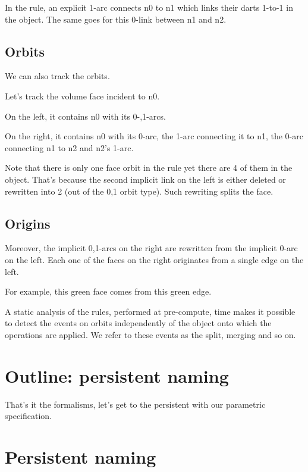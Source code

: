 \documentclass[11pt]{article}
\begin{document}
In the rule, an explicit 1-arc connects n0 to n1 which links their darts 1-to-1 in the object. %
The same goes for this 0-link between n1 and n2. %

\subsection{Orbits}
\label{sec:orgcf72bd7}

We can also track the orbits.

Let's track the volume face incident to n0.

On the left, it contains n0 with its 0-,1-arcs.

On the right, it contains n0 with its 0-arc, the 1-arc connecting it to n1, the
0-arc connecting n1 to n2 and n2's 1-arc.

Note that there is only one face orbit in the rule yet there are 4 of them in
the object. %
That's because the second implicit link on the left is either deleted or
rewritten into 2 (out of the 0,1 orbit type). %
Such rewriting splits the face. %

\subsection{Origins}
\label{sec:org341560c}

Moreover, the implicit 0,1-arcs on the right are rewritten from the implicit 0-arc on the left. %
Each one of the faces on the right originates from a single edge on the left.

For example, this green face comes from this green edge.

A static analysis of the rules, performed at pre-compute, time makes it possible
to detect the events on orbits independently of the object onto which the
operations are applied.
We refer to these events as the split, merging and so on.

\section*{Outline: persistent naming}
\label{sec:orgaa5036e}

That's it the formalisms, let's get to the persistent with our parametric
specification.

\section{Persistent naming}
\label{sec:org84648da}
\end{document}
